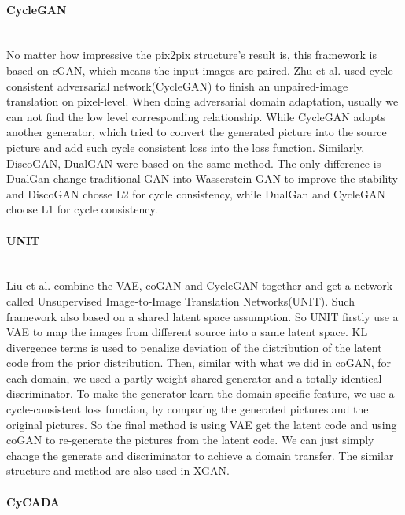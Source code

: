 \documentclass{kththesis}
\begin{document}
\paragraph{CycleGAN}~{}\\

\noindent No matter how impressive the pix2pix structure's result is, this framework is based on cGAN, which means the input images are paired. Zhu et al.\cite{zhu2017unpaired} used cycle-consistent adversarial network(CycleGAN) to finish an unpaired-image translation on pixel-level. When doing adversarial domain adaptation, usually we can not find the low level corresponding relationship. While CycleGAN adopts another generator, which tried to convert the generated picture into the source picture and add such cycle consistent loss into the loss function. Similarly, DiscoGAN\cite{kim2017learning}, DualGAN\cite{yi2017dualgan} were based on the same method. The only difference is DualGan change traditional GAN into Wasserstein GAN\cite{arjovsky2017wasserstein} to improve the stability and DiscoGAN chosse L2 for cycle consistency, while DualGan and CycleGAN choose L1 for cycle consistency. 

\paragraph{UNIT}~{}\\

\noindent Liu et al.\cite{liu2017unsupervised} combine the VAE\cite{kingma2013auto,rezende2014stochastic}, coGAN and CycleGAN together and get a network called Unsupervised Image-to-Image Translation Networks(UNIT). Such framework also based on a shared latent space assumption. So UNIT firstly use a VAE to map the images from different source into a same latent space. KL divergence terms is used to penalize deviation of the distribution of the latent code from the prior distribution. Then, similar with what we did in coGAN, for each domain, we used a partly weight shared generator and a totally identical discriminator. To make the generator learn the domain specific feature, we use a cycle-consistent loss function, by comparing the generated pictures and the original pictures. So the final method is using VAE get the latent code and using coGAN to re-generate the pictures from the latent code. We can just simply change the generate and discriminator to achieve a domain transfer. The similar structure and method are also used in XGAN.\cite{royer2017xgan}

\paragraph{CyCADA}~{}\\
\end{document}
